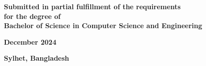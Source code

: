\begin{titlepage}
    \vspace{1.5cm}
    
    {\large \textbf{Submitted in partial fulfillment of the requirements}}\\
    {\large \textbf{for the degree of}}\\
    {\large \textbf{Bachelor of Science in Computer Science and Engineering}}\\
    
    \vspace{1cm}
    
    {\large \textbf{December 2024}}\\
    
    \vspace{1cm}
    
    {\large \textbf{Sylhet, Bangladesh}}
    
\end{titlepage} 